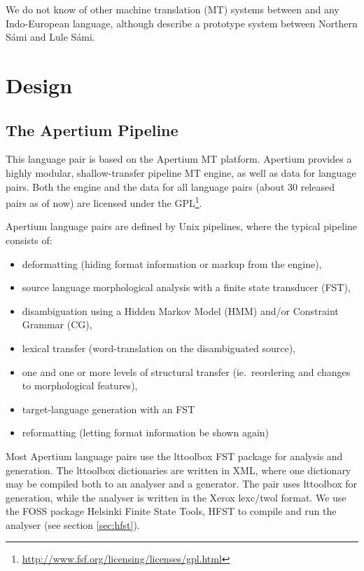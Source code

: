 We do not know of other machine translation (MT) systems between \sme
and any Indo-European language, although \citet{tyers2009dpm} describe
a prototype system between Northern Sámi and Lule Sámi.



\section{Design}
 \label{sec:design}

\subsection{The Apertium Pipeline}
This language pair is based on the Apertium MT
platform\citep{forcada2011afp}. Apertium provides a highly modular,
shallow-transfer pipeline MT engine, as well as data for language
pairs. Both the engine and the data for all language pairs (about 30
released pairs as of now) are licensed under the
GPL\footnote{\href{http://www.fsf.org/licensing/licenses/gpl.html}{http://www.fsf.org/licensing/licenses/gpl.html}}.

Apertium language pairs are defined by Unix pipelines, where the
typical pipeline consists of:

\begin{itemize}
\item deformatting (hiding format information or markup from the
  engine),
\item source language morphological analysis with a finite state
  transducer (FST),
\item disambiguation using a Hidden Markov Model (HMM) and/or
  Constraint Grammar (CG), 
\item lexical transfer (word-translation on the disambiguated source),
\item one and one or more levels of structural transfer
  (ie.~reordering and changes to morphological features), 
\item target-language generation with an FST
\item reformatting (letting format information be shown again)
\end{itemize}

Most Apertium language pairs use the lttoolbox FST package for
analysis and generation. The lttoolbox dictionaries are written in
XML, where one dictionary may be compiled both to an analyser and a
generator. The \smenob{} pair uses lttoolbox for \nob{}
generation, while the \sme{} analyser is written in the Xerox lexc/twol
format\citep{beesley2003fsm}. We use the FOSS package Helsinki Finite
State Tools, HFST \citep{linden2011hfst} to compile and run the
analyser (see section \ref{sec:hfst}).

